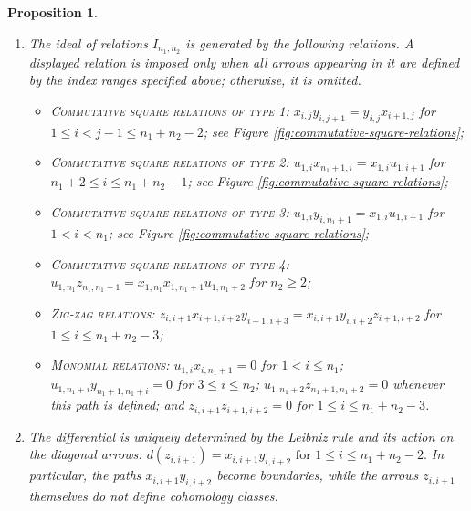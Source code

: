 \documentclass[a4paper, reqno, 11pt]{amsart}
\newtheorem{prop}[theorem]{Proposition}
\theoremstyle{definition}
\begin{document}
\begin{prop}
\begin{enumerate}[label=(\arabic*), leftmargin=*]
			\item The ideal of relations $\widetilde I_{n_1,n_2}$ is generated by the following relations. A displayed relation is imposed only when all arrows appearing in it are defined by the index ranges specified above; otherwise, it is omitted.
			\begin{itemize}[label=--]
				\item \textsc{Commutative square relations of type 1}: $x_{i,j} y_{i,j+1} = y_{i,j} x_{i+1,j}$ for $1\leq i<j-1 \leq n_1+n_2-2$; see Figure \ref{fig:commutative-square-relations};
				\item \textsc{Commutative square relations of type 2}: $u_{1,i} x_{n_1+1,i}=x_{1,i} u_{1,i+1}$ for $n_1+2\leq i\leq  n_1+n_2-1$; see Figure \ref{fig:commutative-square-relations};
				\item \textsc{Commutative square relations of type 3}: $u_{1,i} y_{i,n_1+1}=x_{1,i}u_{1,i+1}$ for $1<i<n_1$; see Figure \ref{fig:commutative-square-relations};	
				\item \textsc{Commutative square relations of type 4}: $u_{1,n_1}z_{n_1,n_1+1}
				= x_{1,n_1}x_{1,n_1+1}u_{1,n_1+2}$ for \(n_2\geq 2\);
				\item \textsc{Zig-zag relations}: $z_{i,i+1} x_{i+1,i+2}  y_{i+1,i+3}= x_{i,i+1}  y_{i,i+2}  z_{i+1,i+2}$ for $1\leq i \leq n_1+n_2-3$;
				\item \textsc{Monomial relations}: 
				$u_{1,i} x_{i,n_1+1}=0$ for $1< i\leq n_1$; 
				$u_{1,n_1+i} y_{n_1+1,n_1+i}=0$ for $3\leq i \leq n_2$; 
				$u_{1,n_1+2} z_{n_1+1,n_1+2}=0$ whenever this path is defined; 
				and $z_{i,i+1} z_{i+1,i+2} = 0$ for $1\leq i \leq n_1+n_2-3$.
			\end{itemize}
			\item The differential is uniquely determined by the Leibniz rule and its action on the diagonal arrows:
			\(
			d(z_{i,i+1}) = x_{i,i+1} y_{i,i+2} \text{~for~} 1\leq i\leq n_1+n_2-2.
			\)
			In particular, the paths \(x_{i,i+1}y_{i,i+2}\) become boundaries, while the arrows \(z_{i,i+1}\) themselves do not define cohomology classes.
		\end{enumerate}
	\end{prop}
	
\end{document}
